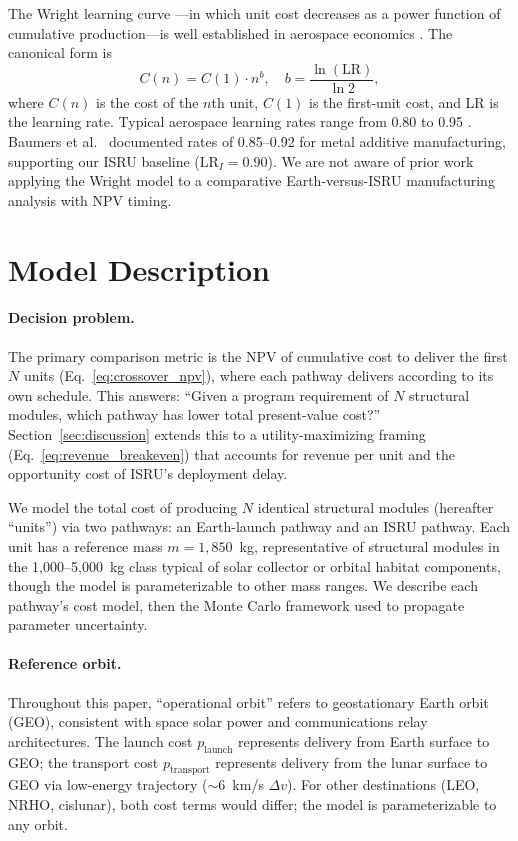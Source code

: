\documentclass[preprint,12pt]{elsarticle}
\begin{document}
The Wright learning curve \cite{wright1936}---in which unit cost decreases as a power function of cumulative production---is well established in aerospace economics \cite{dutton1984,argote1990,nagy2013}. The canonical form is
\begin{equation}
  C(n) = C(1) \cdot n^{b}, \quad b = \frac{\ln(\text{LR})}{\ln 2},
  \label{eq:wright}
\end{equation}
where $C(n)$ is the cost of the $n$th unit, $C(1)$ is the first-unit cost, and LR is the learning rate. Typical aerospace learning rates range from 0.80 to 0.95 \cite{wertz2011}. Baumers et al.\ \cite{baumers2016} documented rates of 0.85--0.92 for metal additive manufacturing, supporting our ISRU baseline ($\mathrm{LR}_I = 0.90$). We are not aware of prior work applying the Wright model to a comparative Earth-versus-ISRU manufacturing analysis with NPV timing.

\section{Model Description}
\label{sec:model}

\paragraph{Decision problem.} The primary comparison metric is the NPV of cumulative cost to deliver the first $N$ units (Eq.~\ref{eq:crossover_npv}), where each pathway delivers according to its own schedule. This answers: ``Given a program requirement of $N$ structural modules, which pathway has lower total present-value cost?'' Section~\ref{sec:discussion} extends this to a utility-maximizing framing (Eq.~\ref{eq:revenue_breakeven}) that accounts for revenue per unit and the opportunity cost of ISRU's deployment delay.

We model the total cost of producing $N$ identical structural modules (hereafter ``units'') via two pathways: an Earth-launch pathway and an ISRU pathway. Each unit has a reference mass $m = 1{,}850$~kg, representative of structural modules in the 1{,}000--5{,}000~kg class typical of solar collector or orbital habitat components, though the model is parameterizable to other mass ranges. We describe each pathway's cost model, then the Monte Carlo framework used to propagate parameter uncertainty.

\paragraph{Reference orbit.} Throughout this paper, ``operational orbit'' refers to geostationary Earth orbit (GEO), consistent with space solar power and communications relay architectures. The launch cost $p_{\mathrm{launch}}$ represents delivery from Earth surface to GEO; the transport cost $p_{\mathrm{transport}}$ represents delivery from the lunar surface to GEO via low-energy trajectory ($\sim$6~km/s $\Delta v$). For other destinations (LEO, NRHO, cislunar), both cost terms would differ; the model is parameterizable to any orbit.
\end{document}
